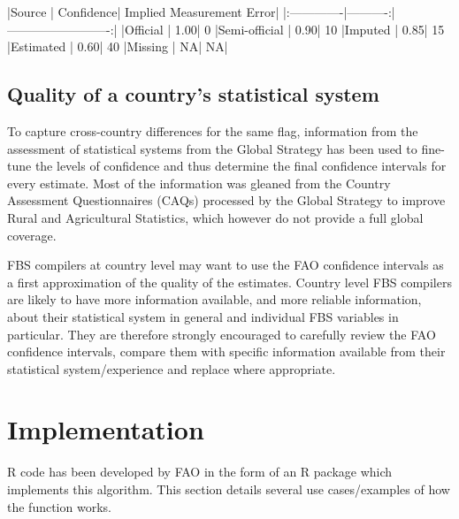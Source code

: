 \documentclass[nojss]{jss}
\begin{document}
\begin{Schunk}
\begin{Soutput}
|Source        | Confidence| Implied Measurement Error|
|:-------------|----------:|-------------------------:|
|Official      |       1.00|                        0%|
|Semi-official |       0.90|                       10%|
|Imputed       |       0.85|                       15%|
|Estimated     |       0.60|                       40%|
|Missing       |         NA|                        NA|
\end{Soutput}
\end{Schunk}

\subsection{Quality of a country's statistical system}
To capture cross-country differences for the same flag, information from the assessment of statistical systems from the Global Strategy has been used to fine-tune the levels of confidence and thus determine the final confidence intervals for every estimate. Most of the information was gleaned from the Country Assessment Questionnaires (CAQs) processed by the Global Strategy to improve Rural and Agricultural Statistics, which however do not provide a full global coverage.

FBS compilers at country level may want to use the FAO confidence intervals as a first approximation of the quality of the estimates. Country level FBS compilers are likely to have more information available, and more reliable information, about their statistical system in general and individual FBS variables in particular. They are therefore strongly encouraged to carefully review the FAO confidence intervals, compare them with specific information available from their statistical system/experience and replace where appropriate.

\section{Implementation}
R code has been developed by FAO in the form of an R package which implements this algorithm.  This section details several use cases/examples of how the function works.
\end{document}
